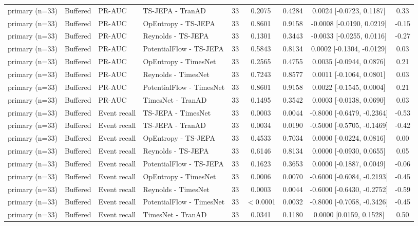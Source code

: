\begin{table}[t]
\begin{tabular}{@{}llllccccc@{}}
primary (n=33) & Buffered & PR-AUC & TS-JEPA - TranAD & 33 & 0.2075 & 0.4284 & 0.0024 [-0.0723, 0.1187] & 0.33 \\
primary (n=33) & Buffered & PR-AUC & OpEntropy - TS-JEPA & 33 & 0.8601 & 0.9158 & -0.0008 [-0.0190, 0.0219] & -0.15 \\
primary (n=33) & Buffered & PR-AUC & Reynolds - TS-JEPA & 33 & 0.1301 & 0.3443 & -0.0033 [-0.0255, 0.0116] & -0.27 \\
primary (n=33) & Buffered & PR-AUC & PotentialFlow - TS-JEPA & 33 & 0.5843 & 0.8134 & 0.0002 [-0.1304, -0.0129] & 0.03 \\
primary (n=33) & Buffered & PR-AUC & OpEntropy - TimesNet & 33 & 0.2565 & 0.4755 & 0.0035 [-0.0944, 0.0876] & 0.21 \\
primary (n=33) & Buffered & PR-AUC & Reynolds - TimesNet & 33 & 0.7243 & 0.8577 & 0.0011 [-0.1064, 0.0801] & 0.03 \\
primary (n=33) & Buffered & PR-AUC & PotentialFlow - TimesNet & 33 & 0.8601 & 0.9158 & 0.0022 [-0.1545, 0.0004] & 0.21 \\
primary (n=33) & Buffered & PR-AUC & TimesNet - TranAD & 33 & 0.1495 & 0.3542 & 0.0003 [-0.0138, 0.0690] & 0.03 \\
primary (n=33) & Buffered & Event recall & TS-JEPA - TimesNet & 33 & 0.0003 & 0.0044 & -0.8000 [-0.6479, -0.2364] & -0.53 \\
primary (n=33) & Buffered & Event recall & TS-JEPA - TranAD & 33 & 0.0034 & 0.0190 & -0.5000 [-0.5705, -0.1469] & -0.42 \\
primary (n=33) & Buffered & Event recall & OpEntropy - TS-JEPA & 33 & 0.4533 & 0.7034 & 0.0000 [-0.0224, 0.0816] & 0.00 \\
primary (n=33) & Buffered & Event recall & Reynolds - TS-JEPA & 33 & 0.6146 & 0.8134 & 0.0000 [-0.0930, 0.0655] & 0.05 \\
primary (n=33) & Buffered & Event recall & PotentialFlow - TS-JEPA & 33 & 0.1623 & 0.3653 & 0.0000 [-0.1887, 0.0049] & -0.06 \\
primary (n=33) & Buffered & Event recall & OpEntropy - TimesNet & 33 & 0.0006 & 0.0070 & -0.6000 [-0.6084, -0.2193] & -0.45 \\
primary (n=33) & Buffered & Event recall & Reynolds - TimesNet & 33 & 0.0003 & 0.0044 & -0.6000 [-0.6430, -0.2752] & -0.59 \\
primary (n=33) & Buffered & Event recall & PotentialFlow - TimesNet & 33 & $<$0.0001 & 0.0032 & -0.8000 [-0.7058, -0.3426] & -0.45 \\
primary (n=33) & Buffered & Event recall & TimesNet - TranAD & 33 & 0.0341 & 0.1180 & 0.0000 [0.0159, 0.1528] & 0.50 \\

\end{tabular}
\end{table}
